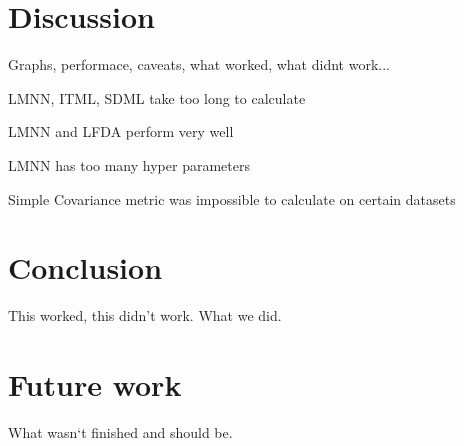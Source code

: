 \documentclass[12pt,a4paper]{report}
\let\openright=\clearpage
\begin{document}

\chapter{Discussion}

Graphs, performace, caveats, what worked, what didnt work...

LMNN, ITML, SDML take too long to calculate

LMNN and LFDA perform very well

LMNN has too many hyper parameters

Simple Covariance metric was impossible to calculate on certain datasets


\chapter*{Conclusion}

This worked, this didn't work. What we did.

\chapter*{Future work}

What wasn`t finished and should be.




\listoffigures

\listoftables



\openright
\end{document}
